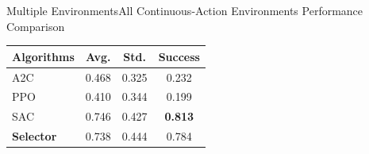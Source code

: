 \documentclass[aspectratio=169]{beamer}
\begin{document}
\begin{frame}{Multiple Environments}{All Continuous-Action Environments Performance Comparison}
  \centering
  \begin{tabular}{@{}lccc@{}}
    \toprule
    \textbf{Algorithms} & \textbf{Avg.} & \textbf{Std.} & \textbf{Success} \\
    \midrule
    A2C & 0.468 & 0.325 & 0.232 \\
    PPO & 0.410 & 0.344 & 0.199 \\
    SAC & 0.746 & 0.427 & \textbf{0.813} \\
    \textbf{Selector} & 0.738 & 0.444 & 0.784 \\
    \bottomrule
  \end{tabular}
\end{frame}
\end{document}
